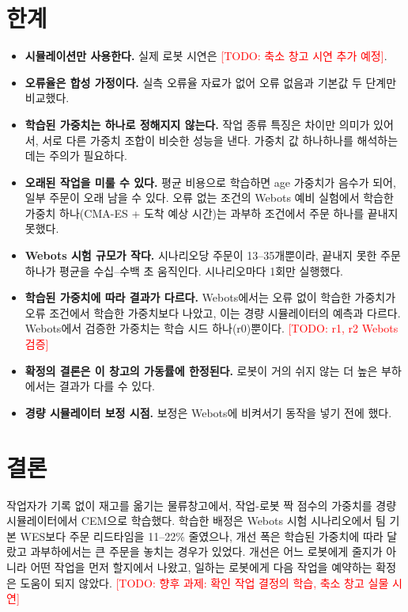 \documentclass[10pt,twocolumn]{article}
\newcommand{\todo}[1]{\textcolor{red}{[TODO: #1]}}
\begin{document}
\section{한계}
\begin{itemize}
  \item \textbf{시뮬레이션만 사용한다.} 실제 로봇 시연은 \todo{축소 창고 시연 추가 예정}.
  \item \textbf{오류율은 합성 가정이다.} 실측 오류율 자료가 없어 오류 없음과 기본값 두 단계만 비교했다.
  \item \textbf{학습된 가중치는 하나로 정해지지 않는다.} 작업 종류 특징은 차이만 의미가 있어서, 서로 다른 가중치 조합이 비슷한 성능을 낸다. 가중치 값 하나하나를 해석하는 데는 주의가 필요하다.
  \item \textbf{오래된 작업을 미룰 수 있다.} 평균 비용으로 학습하면 age 가중치가 음수가 되어, 일부 주문이 오래 남을 수 있다. 오류 없는 조건의 Webots 예비 실험에서 학습한 가중치 하나(CMA-ES + 도착 예상 시간)는 과부하 조건에서 주문 하나를 끝내지 못했다.
  \item \textbf{Webots 시험 규모가 작다.} 시나리오당 주문이 13--35개뿐이라, 끝내지 못한 주문 하나가 평균을 수십--수백 초 움직인다. 시나리오마다 1회만 실행했다.
  \item \textbf{학습된 가중치에 따라 결과가 다르다.} Webots에서는 오류 없이 학습한 가중치가 오류 조건에서 학습한 가중치보다 나았고, 이는 경량 시뮬레이터의 예측과 다르다. Webots에서 검증한 가중치는 학습 시드 하나(r0)뿐이다. \todo{r1, r2 Webots 검증}
  \item \textbf{확정의 결론은 이 창고의 가동률에 한정된다.} 로봇이 거의 쉬지 않는 더 높은 부하에서는 결과가 다를 수 있다.
  \item \textbf{경량 시뮬레이터 보정 시점.} 보정은 Webots에 비켜서기 동작을 넣기 전에 했다.
\end{itemize}

\section{결론}
작업자가 기록 없이 재고를 옮기는 물류창고에서, 작업-로봇 짝 점수의 가중치를 경량 시뮬레이터에서 CEM으로 학습했다.
학습한 배정은 Webots 시험 시나리오에서 팀 기본 WES보다 주문 리드타임을 11--22\% 줄였으나, 개선 폭은 학습된 가중치에 따라 달랐고 과부하에서는 큰 주문을 놓치는 경우가 있었다.
개선은 어느 로봇에게 줄지가 아니라 어떤 작업을 먼저 할지에서 나왔고, 일하는 로봇에게 다음 작업을 예약하는 확정은 도움이 되지 않았다.
\todo{향후 과제: 확인 작업 결정의 학습, 축소 창고 실물 시연}
\end{document}

